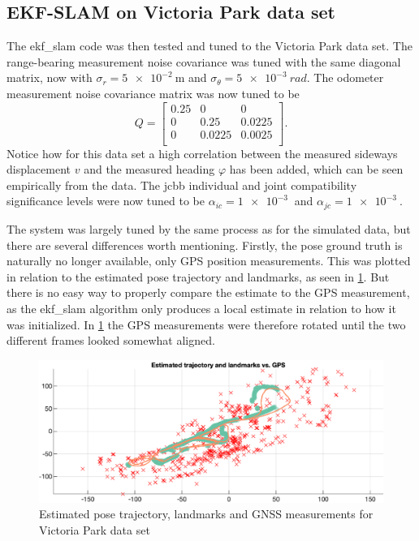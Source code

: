 
\subsection{EKF-SLAM on Victoria Park data set}

The \acrshort{ekf_slam} code was then tested and tuned to the Victoria Park data set. The range-bearing measurement noise covariance was tuned with the same diagonal matrix, now with $\sigma_r = \SI{5e-2}{\meter}$ and $\sigma_\theta = \SI{5e-3}{rad}$. The odometer measurement noise covariance matrix was now tuned to be
\begin{equation}
    Q = \begin{bmatrix}
        0.25 & 0 & 0 \\
        0 & 0.25 & 0.0225 \\
        0 & 0.0225 & 0.0025 \\
    \end{bmatrix}.
\end{equation}
Notice how for this data set a high correlation between the measured sideways displacement $v$ and the measured heading $\varphi$ has been added, which can be seen empirically from the data. The \acrshort{jcbb} individual and joint compatibility significance levels were now tuned to be $\alpha_{ic} = \SI{1e-3}{}$ and $\alpha_{jc} = \SI{1e-3}{}$.

The system was largely tuned by the same process as for the simulated data, but there are several differences worth mentioning. Firstly, the pose ground truth is naturally no longer available, only GPS position measurements. This was plotted in relation to the estimated pose trajectory and landmarks, as seen in \cref{fig:ga_3_real_trajectory}. But there is no easy way to properly compare the estimate to the GPS measurement, as the \acrshort{ekf_slam} algorithm only produces a local estimate in relation to how it was initialized. In \cref{fig:ga_3_real_trajectory} the GPS measurements were therefore rotated until the two different frames looked somewhat aligned.

\begin{figure}[!htb]
    \centering
    \includegraphics[width=0.6\linewidth]{figures/ga_3/real_trajectory.eps}
    \caption{Estimated pose trajectory, landmarks and GNSS measurements for Victoria Park data set}
    \label{fig:ga_3_real_trajectory}
\end{figure}

